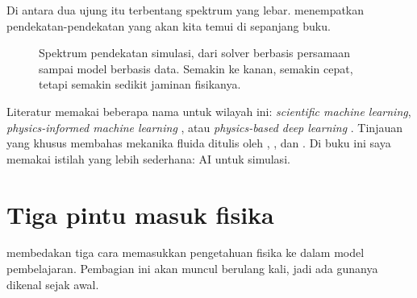 Di antara dua ujung itu terbentang spektrum yang lebar.  menempatkan
pendekatan-pendekatan yang akan kita temui di sepanjang buku.

\begin{figure}[ht]
\centering
{}
\caption{Spektrum pendekatan simulasi, dari solver berbasis persamaan sampai model berbasis data.
Semakin ke kanan, semakin cepat, tetapi semakin sedikit jaminan fisikanya.}
\label{fig:spektrum}
\end{figure}

Literatur memakai beberapa nama untuk wilayah ini: \emph{scientific machine learning},
\emph{physics-informed machine learning} \citep{karniadakis2021}, atau \emph{physics-based deep
learning} \citep{thuerey2021}. Tinjauan yang khusus membahas mekanika fluida ditulis oleh
\citet{brunton2020}, \citet{vinuesa2022}, dan \citet{lino2023}. Di buku ini saya memakai istilah
yang lebih sederhana: AI untuk simulasi.

\section{Tiga pintu masuk fisika}

\citet{karniadakis2021} membedakan tiga cara memasukkan pengetahuan fisika ke dalam model
pembelajaran. Pembagian ini akan muncul berulang kali, jadi ada gunanya dikenal sejak awal.

